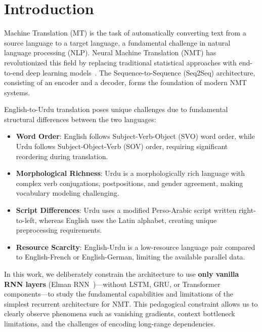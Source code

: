 \documentclass[runningheads]{llncs}
\begin{document}
\section{Introduction}

Machine Translation (MT) is the task of automatically converting text from a source language to a target language, a fundamental challenge in natural language processing (NLP). Neural Machine Translation (NMT) has revolutionized this field by replacing traditional statistical approaches with end-to-end deep learning models~\cite{sutskever2014sequence}. The Sequence-to-Sequence (Seq2Seq) architecture, consisting of an encoder and a decoder, forms the foundation of modern NMT systems.

English-to-Urdu translation poses unique challenges due to fundamental structural differences between the two languages:

\begin{itemize}
    \item \textbf{Word Order}: English follows Subject-Verb-Object (SVO) word order, while Urdu follows Subject-Object-Verb (SOV) order, requiring significant reordering during translation.
    \item \textbf{Morphological Richness}: Urdu is a morphologically rich language with complex verb conjugations, postpositions, and gender agreement, making vocabulary modeling challenging.
    \item \textbf{Script Differences}: Urdu uses a modified Perso-Arabic script written right-to-left, whereas English uses the Latin alphabet, creating unique preprocessing requirements.
    \item \textbf{Resource Scarcity}: English-Urdu is a low-resource language pair compared to English-French or English-German, limiting the available parallel data.
\end{itemize}

In this work, we deliberately constrain the architecture to use \textbf{only vanilla RNN layers} (Elman RNN~\cite{elman1990finding})---without LSTM, GRU, or Transformer components---to study the fundamental capabilities and limitations of the simplest recurrent architecture for NMT. This pedagogical constraint allows us to clearly observe phenomena such as vanishing gradients, context bottleneck limitations, and the challenges of encoding long-range dependencies.
\end{document}
